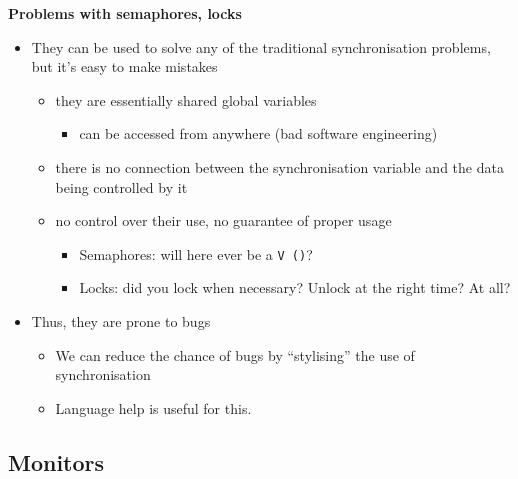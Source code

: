 \documentclass[11pt,a4paper]{article}
\begin{document}
\textbf{Problems with semaphores, locks}
\begin{itemize}
    \item They can be used to solve any of the traditional synchronisation problems,
        but it's easy to make mistakes
        \begin{itemize}
            \item they are essentially shared global variables
                \begin{itemize}
                    \item can be accessed from anywhere (bad software engineering)
                \end{itemize}
            \item there is no connection between the synchronisation variable and the
                data being controlled by it
            \item no control over their use, no guarantee of proper usage
                \begin{itemize}
                    \item Semaphores: will here ever be a \texttt{V\,()}?
                    \item Locks: did you lock when necessary?
                        Unlock at the right time?
                        At all?
                \end{itemize}
        \end{itemize}
    \item Thus, they are prone to bugs
        \begin{itemize}
            \item We can reduce the chance of bugs by ``stylising'' the use of synchronisation
            \item Language help is useful for this.
        \end{itemize}
\end{itemize}

\subsection{Monitors}
\end{document}
